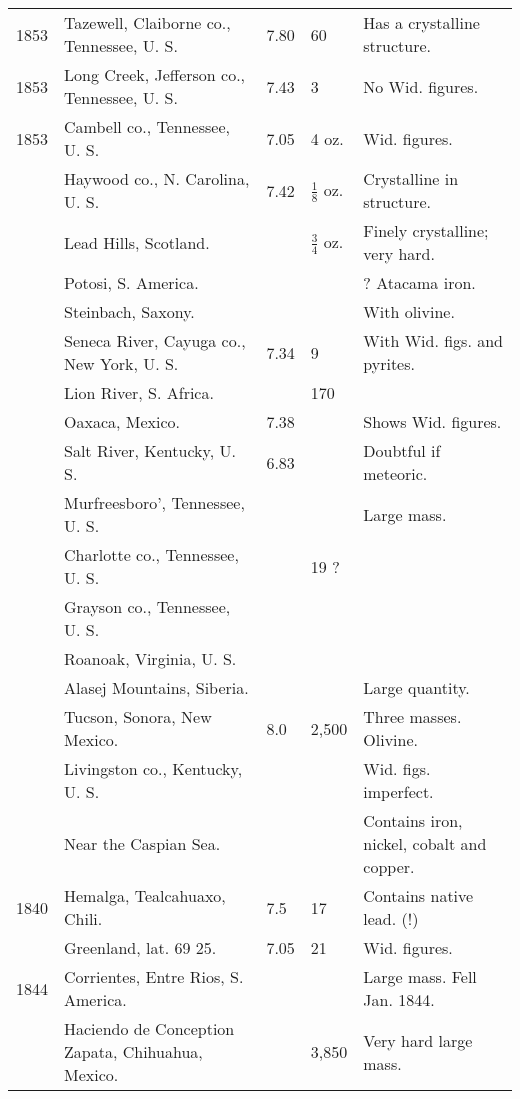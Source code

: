 \documentclass[a4paper, 12pt, oneside]{article}
\begin{document}
\begin{center}
\begin{longtable}{|p{16mm}|p{34mm}|p{10mm}|p{12mm}|p{40mm}|}
        1853 & Tazewell, Claiborne co., Tennessee, U. S. & 7.80 & 60 & Has a crystalline structure. \\
        1853 & Long Creek, Jefferson co., Tennessee, U. S. & 7.43 & 3 & No Wid. figures. \\
        1853 & Cambell co., Tennessee, U. S. & 7.05 & 4 oz. & Wid. figures. \\
        ~ & Haywood co., N. Carolina, U. S. & 7.42 & $\frac{1}{8}$ oz. & Crystalline in structure. \\
        ~ & Lead Hills, Scotland. & ~ & $\frac{3}{4}$ oz. & Finely crystalline; very hard. \\
        ~ & Potosi, S. America. & ~ & ~ & ? Atacama iron. \\
        ~ & Steinbach, Saxony. & ~ & ~ & With olivine. \\
        ~ & Seneca River, Cayuga co., New York, U. S. & 7.34 & 9 & With Wid. figs. and pyrites. \\
        ~ & Lion River, S. Africa. & ~ & 170 & ~ \\
        ~ & Oaxaca, Mexico. & 7.38 & ~ & Shows Wid. figures. \\
        ~ & Salt River, Kentucky, U. S. & 6.83 & ~ & Doubtful if meteoric. \\
        ~ & Murfreesboro’, Tennessee, U. S. & ~ & ~ & Large mass. \\
        ~ & Charlotte co., Tennessee, U. S. & ~ & 19 ? & ~ \\
        ~ & Grayson co., Tennessee, U. S. & ~ & ~ & ~ \\
        ~ & Roanoak, Virginia, U. S. & ~ & ~ & ~ \\
        ~ & Alasej Mountains, Siberia. & ~ & ~ & Large quantity. \\
        ~ & Tucson, Sonora, New Mexico. & 8.0 & 2,500 & Three masses. Olivine. \\
        ~ & Livingston co., Kentucky, U. S. & ~ & ~ & Wid. figs. imperfect. \\
        ~ & Near the Caspian Sea. & ~ & ~ & Contains iron, nickel, cobalt and copper. \\
        1840 & Hemalga, Tealcahuaxo, Chili. & 7.5 & 17 & Contains native lead. (!) \\
        ~ & Greenland, lat. 69 25. & 7.05 & 21 & Wid. figures. \\
        1844 & Corrientes, Entre Rios, S. America. & ~ & ~ & Large mass. Fell Jan. 1844. \\
        ~ & Haciendo de Conception Zapata, Chihuahua, Mexico. & ~ & 3,850 & Very hard large mass. \\

\end{longtable}
\end{center}
\end{document}
